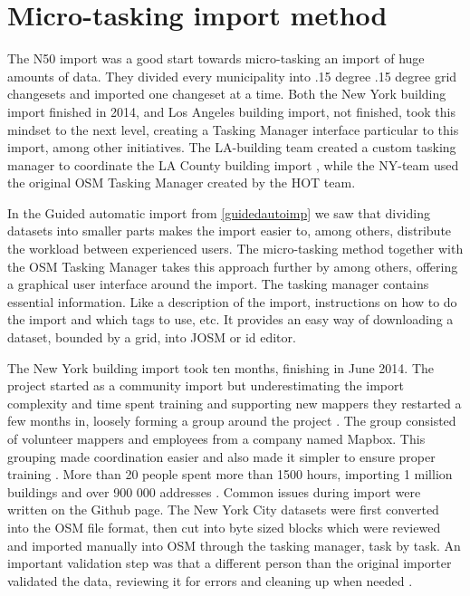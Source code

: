 \section{Micro-tasking import method}\label{sec:importmicro}
The N50 import was a good start towards micro-tasking an import of huge amounts of data. They divided every municipality into .15 degree .15 degree grid changesets and imported one changeset at a time. Both the New York building import finished in 2014, and Los Angeles building import, not finished, took this mindset to the next level, creating a Tasking Manager interface particular to this import, among other initiatives. The LA-building team created a custom tasking manager to coordinate the LA County building import \cite{OSMTaskingManager}, while the NY-team used the original OSM Tasking Manager created by the HOT team. 

In the Guided automatic import from \ref{guidedautoimp} we saw that dividing datasets into smaller parts makes the import easier to, among others, distribute the workload between experienced users. The micro-tasking method together with the OSM Tasking Manager takes this approach further by among others, offering a graphical user interface around the import. The tasking manager contains essential information. Like a description of the import, instructions on how to do the import and which tags to use, etc. It provides an easy way of downloading a dataset, bounded by a grid, into JOSM or id editor.

The New York building import took ten months, finishing in June 2014. The project started as a community import but underestimating the import complexity and time spent training and supporting new mappers they restarted a few months in, loosely forming a group around the project \cite{Barth2014}. The group consisted of volunteer mappers and employees from a company named Mapbox. This grouping made coordination easier and also made it simpler to ensure proper training \cite{Barth2014a}. More than 20 people spent more than 1500 hours, importing 1 million buildings and over 900 000 addresses \cite{Barth2014}. Common issues during import were written on the Github page. The New York City datasets were first converted into the OSM file format, then cut into byte sized blocks which were reviewed and imported manually into OSM through the tasking manager, task by task. An important validation step was that a different person than the original importer validated the data, reviewing it for errors and cleaning up when needed \cite{Barth2014}. 

